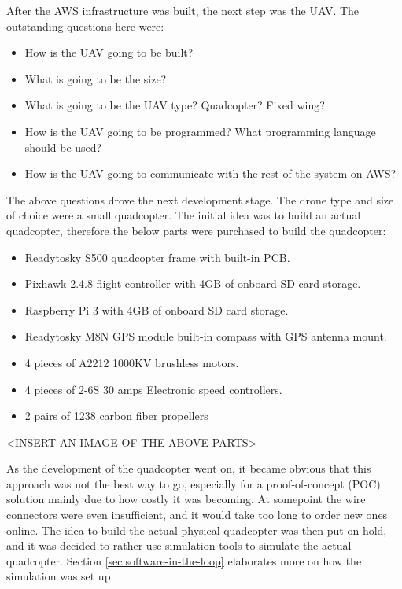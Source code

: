 After the AWS infrastructure was built, the next step was the UAV. The outstanding questions here were:

\begin{itemize}
    \item How is the UAV going to be built?
    \item What is going to be the size?
    \item What is going to be the UAV type? Quadcopter? Fixed wing?
    \item How is the UAV going to be programmed? What programming language should be used?
    \item How is the UAV going to communicate with the rest of the system on AWS?
\end{itemize}

The above questions drove the next development stage. The drone type and size of choice were a small quadcopter. The initial idea was to build an actual quadcopter, therefore the below parts were purchased to build the quadcopter:

\begin{itemize}
    \item Readytosky S500 quadcopter frame with built-in PCB.
    \item Pixhawk 2.4.8 flight controller with 4GB of onboard SD card storage.
    \item Raspberry Pi 3 with 4GB of onboard SD card storage.
    \item Readytosky M8N GPS module built-in compass with GPS antenna mount.
    \item 4 pieces of A2212 1000KV brushless motors.
    \item 4 pieces of 2-6S 30 amps Electronic speed controllers.
    \item 2 pairs of 1238 carbon fiber propellers
\end{itemize}

<INSERT AN IMAGE OF THE ABOVE PARTS>

As the development of the quadcopter went on, it became obvious that this approach was not the best way to go, especially for a proof-of-concept (POC) solution mainly due to how costly it was becoming. At somepoint the wire connectors were even insufficient, and it would take too long to order new ones online. The idea to build the actual physical quadcopter was then put on-hold, and it was decided to rather use simulation tools to simulate the actual quadcopter. Section \ref{sec:software-in-the-loop} elaborates more on how the simulation was set up.

